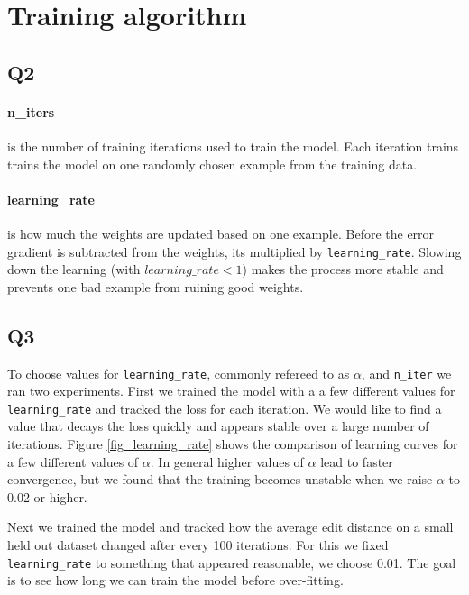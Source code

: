 \documentclass[12pt]{article}
\begin{document}

\section{Training algorithm}

\subsection{Q2}

\paragraph{n\_iters} is the number of training iterations used to train the model. Each iteration trains trains the model on one randomly chosen example from the training data.

\paragraph{learning\_rate} is how much the weights are updated based on one example. Before the error gradient is subtracted from the weights, its multiplied by \texttt{learning\_rate}. Slowing down the learning (with $learning\_rate < 1$) makes the process more stable and prevents one bad example from ruining good weights.


\subsection{Q3}

To choose values for \texttt{learning\_rate}, commonly refereed to as $\alpha$, and \texttt{n\_iter} we ran two experiments. 
First we trained the model with a a few different values for \texttt{learning\_rate} and tracked the loss for each iteration. We would like to find a value that decays the loss quickly and appears stable over a large number of iterations.
Figure \ref{fig_learning_rate} shows the comparison of learning curves for a few different values of $\alpha$. In general higher values of $\alpha$ lead to faster convergence, but we found that the training becomes unstable when we raise $\alpha$ to 0.02 or higher. 

Next we trained the model and tracked how the average edit distance on a small held out dataset changed after every 100 iterations. For this we fixed \texttt{learning\_rate} to something that appeared reasonable, we choose 0.01. The goal is to see how long we can train the model before over-fitting.
\end{document}
